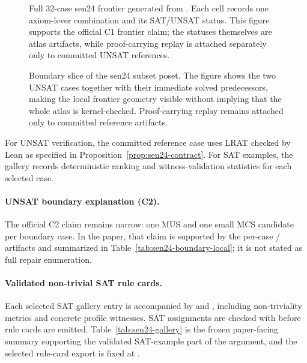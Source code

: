 \begin{figure}[t]
\centering

\caption{Full 32-case sen24 frontier generated from . Each cell records one axiom-lever combination and its SAT/UNSAT status. This figure supports the official C1 frontier claim; the statuses themselves are atlas artifacts, while proof-carrying replay is attached separately only to committed UNSAT references.}
\label{fig:sen24-frontier-matrix}
\end{figure}

\begin{figure}[t]
\centering

\caption{Boundary slice of the sen24 subset poset. The figure shows the two UNSAT cases together with their immediate solved predecessors, making the local frontier geometry visible without implying that the whole atlas is kernel-checked. Proof-carrying replay remains attached only to committed reference artifacts.}
\label{fig:sen24-frontier-structure}
\end{figure}

For UNSAT verification, the committed reference case uses LRAT checked by Lean as specified in Proposition~\ref{prop:sen24-contract}.
For SAT examples, the gallery records deterministic ranking and witness-validation statistics for each selected case.

\paragraph{UNSAT boundary explanation (C2).}
The official C2 claim remains narrow: one MUS and one small MCS candidate per boundary case.
In the paper, that claim is supported by the per-case  /  artifacts and summarized in Table~\ref{tab:sen24-boundary-local}; it is not stated as full repair enumeration.

\begin{table}[t]
\centering

\caption{Local sen24 boundary explanation for the official C2 claim. Each row records one UNSAT boundary case together with one MUS and one small MCS candidate extracted from the per-case artifacts.}
\label{tab:sen24-boundary-local}
\end{table}

\paragraph{Validated non-trivial SAT rule cards.}
Each selected SAT gallery entry is accompanied by  and ,
including non-triviality metrics and concrete profile witnesses. SAT assignments are checked with
 before rule cards are emitted.
Table~\ref{tab:sen24-gallery} is the frozen paper-facing summary supporting the validated SAT-example part of the argument, and the selected rule-card export is fixed at
.

